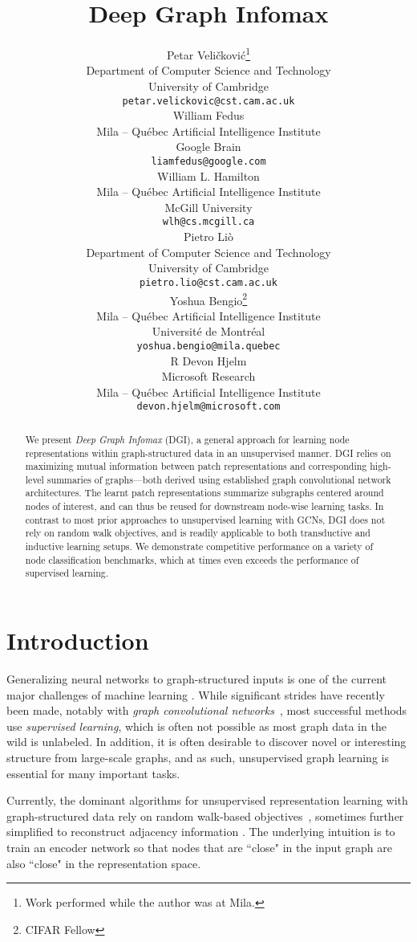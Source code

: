 \documentclass{article} \usepackage{iclr2019_conference,times}
\title{Deep Graph Infomax}
\author{Petar Veli\v{c}kovi\'{c}\thanks{Work performed while the author was at Mila.} \\
Department of Computer Science and Technology\\
University of Cambridge\\
\texttt{petar.velickovic@cst.cam.ac.uk} \\
\And
William Fedus \\
Mila -- Qu\'{e}bec Artificial Intelligence Institute \\
Google Brain \\
\texttt{liamfedus@google.com} \\
\And
William L. Hamilton\\
Mila -- Qu\'{e}bec Artificial Intelligence Institute\\
McGill University\\
\texttt{wlh@cs.mcgill.ca}\\
\And
Pietro Li\`{o} \\
Department of Computer Science and Technology\\
University of Cambridge\\
\texttt{pietro.lio@cst.cam.ac.uk} \\
\And
Yoshua Bengio\thanks{CIFAR Fellow} \\
Mila -- Qu\'{e}bec Artificial Intelligence Institute\\
Universit\'{e} de Montr\'{e}al\\
\texttt{yoshua.bengio@mila.quebec} \\
\And
R Devon Hjelm \\
Microsoft Research \\
Mila -- Qu\'{e}bec Artificial Intelligence Institute\\
\texttt{devon.hjelm@microsoft.com} \\
}
\begin{document}
\maketitle

\begin{abstract}
We present \emph{Deep Graph Infomax} (DGI), a general approach for learning node representations within graph-structured data in an unsupervised manner. DGI relies on maximizing mutual information between patch representations and corresponding high-level summaries of graphs---both derived using established graph convolutional network architectures. The learnt patch representations summarize subgraphs centered around nodes of interest, and can thus be reused for downstream node-wise learning tasks. In contrast to most prior approaches to unsupervised learning with GCNs, DGI does not rely on random walk objectives, and is readily applicable to both transductive and inductive learning setups. We demonstrate competitive performance on a variety of node classification benchmarks, which at times even exceeds the performance of supervised learning.
\end{abstract}

\section{Introduction}
Generalizing neural networks to graph-structured inputs is one of the current major challenges of machine learning \citep{bronstein2017geometric,hamilton2017representation,battaglia2018relational}. 
While significant strides have recently been made, notably with \emph{graph convolutional networks}~\citep{kipf2016semi,gilmer2017neural,velickovic2018graph}, most successful methods use \emph{supervised learning}, which is often not possible as most graph data in the wild is unlabeled. In addition, it is often desirable to discover novel or interesting structure from large-scale graphs, and as such, unsupervised graph learning is essential for many important tasks.

Currently, the dominant algorithms for unsupervised representation learning with graph-structured data rely on random walk-based objectives~\citep{grover2016node2vec,perozzi2014deepwalk,tang2015line,hamilton2017inductive}, sometimes further simplified to reconstruct adjacency information \citep{kipf2016variational,duran2017learning}.
The underlying intuition is to train an encoder network so that nodes that are ``close" in the input graph are also ``close" in the representation space.
\end{document}
